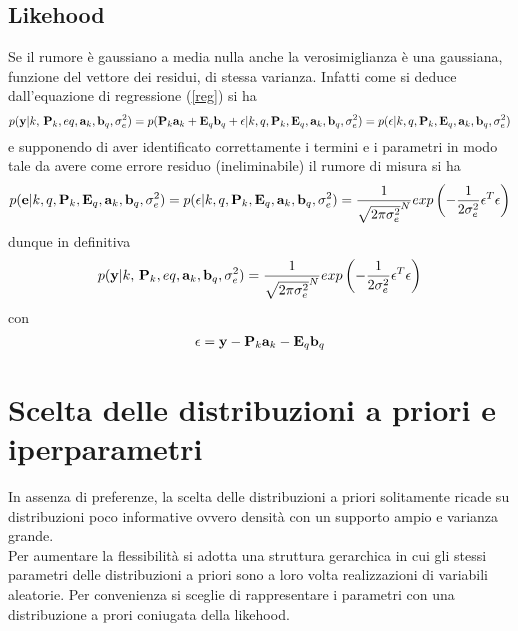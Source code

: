 \subsection{Likehood}
Se il rumore è gaussiano a media nulla anche la verosimiglianza è una gaussiana, funzione del vettore dei residui, di stessa varianza. Infatti come si deduce dall’equazione
di regressione (\ref{reg}) si ha
\begin{equation}
p(\textbf{y}|k,\,\textbf{P}_k,eq,\textbf{a}_k,\textbf{b}_q,\sigma_e^2)=p(\textbf{P}_k\textbf{a}_k+\textbf{E}_q\textbf{b}_q+\epsilon|k,q,\textbf{P}_k,\textbf{E}_q,\textbf{a}_k,\textbf{b}_q,\sigma_e^2)=p(\epsilon|k,q,\textbf{P}_k,\textbf{E}_q,\textbf{a}_k,\textbf{b}_q,\sigma_e^2)
\end{equation}
e supponendo di aver identificato correttamente i termini e i parametri in modo tale
da avere come errore residuo (ineliminabile) il rumore di misura si ha
\begin{equation}
p(\textbf{e}|k, q, \textbf{P}_k , \textbf{E}_q , \textbf{a}_k , \textbf{b}_q , \sigma_e^2 ) = p(\epsilon |k, q, \textbf{P}_k , \textbf{E}_q , \textbf{a}_k , \textbf{b}_q , \sigma_e^2 )=\frac{1}{\sqrt{2\pi\sigma_e^2}^N}exp\left(-\frac{1}{2\sigma_e^2}\epsilon^T\epsilon\right)
\end{equation}
dunque in definitiva
\begin{equation}
p(\textbf{y}|k,\,\textbf{P}_k,eq,\textbf{a}_k,\textbf{b}_q,\sigma_e^2)=\frac{1}{\sqrt{2\pi\sigma_e^2}^N}exp\left(-\frac{1}{2\sigma_e^2}\epsilon^T\epsilon\right)
\end{equation}
con
\begin{equation}
\epsilon=\textbf{y}-\textbf{P}_k\textbf{a}_k-\textbf{E}_q\textbf{b}_q
\end{equation}
\section{Scelta delle distribuzioni a priori e iperparametri}
In assenza di preferenze, la scelta delle distribuzioni a priori solitamente ricade su
distribuzioni poco informative ovvero densità con un supporto ampio e varianza
grande.\\
Per aumentare la flessibilità si adotta una struttura gerarchica in cui gli stessi
parametri delle distribuzioni a priori sono a loro volta realizzazioni di variabili aleatorie. Per convenienza si sceglie di rappresentare i parametri con una distribuzione a
prori coniugata della likehood.
